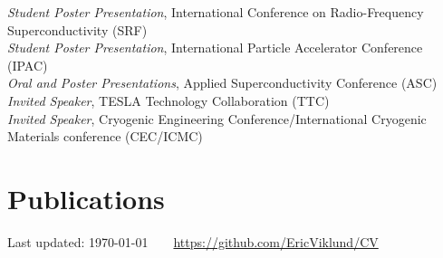 \documentclass[11pt]{article} %
\begin{document}
\emph{Student Poster Presentation}, International Conference on Radio-Frequency Superconductivity (SRF)\\
\emph{Student Poster Presentation}, International Particle Accelerator Conference (IPAC)\\
\emph{Oral and Poster Presentations}, Applied Superconductivity Conference (ASC)\\
\emph{Invited Speaker}, TESLA Technology Collaboration (TTC)\\
\emph{Invited Speaker}, Cryogenic Engineering Conference/International Cryogenic Materials conference (CEC/ICMC)

\section*{Publications}

\nocite{*}
\printbibliography[heading=none]




\begin{center}
	\scriptsize
	Last updated: \today~~\raisebox{-0.5pt}{\textbullet}~~\href{https://github.com/EricViklund/CV}{https://github.com/EricViklund/CV}
\end{center}

\end{document}
